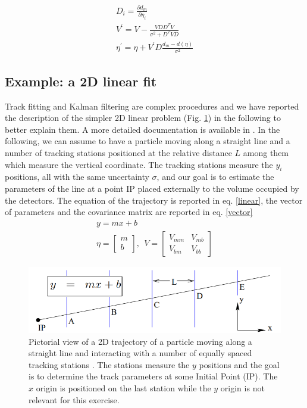 \documentclass[12pt,a4paper,openright, oneside, titlepage]{book} %
\begin{document}
\begin{equation}
\begin{gathered}
D_i = \frac{\partial d_m}{\partial \eta_i} \\
V^\prime = V - \frac{VDD^TV}{\sigma^2+D^TVD}\\
\eta^\prime = \eta + V^\prime D \frac{d_m-d(\eta)}{\sigma^2}
\end{gathered} 
\label{eq_Kalman}
\end{equation}

\subsection{Example: a 2D linear fit}
\label{2Dfit}
Track fitting and Kalman filtering are complex procedures 
and we have reported the description of the simpler 2D linear problem (Fig. \ref{_Kutschke_Kalman})
in the following to better explain them. A more detailed documentation is available in 
 \cite{Kutschke} \cite{KutschkePaper}. 
In the following, we can assume to have a particle moving along a straight line 
and a number of tracking stations positioned at the relative
distance $L$ among them which measure the vertical coordinate.
The tracking stations measure the $y_i$ positions, 
all with the same uncertainty $\sigma$, 
and our goal is to estimate the parameters of the line at a point IP
placed externally to the volume occupied by the detectors.
The equation of the trajectory is reported in eq. \ref{linear}, 
the vector of parameters and the covariance matrix are reported in eq. \ref{vector}
\begin{gather}
y = mx +b \label{linear}\\
\eta = \begin{bmatrix} m \\  b \end{bmatrix},\ \ V=\begin{bmatrix} V_{mm}& V_{mb} \\ V_{bm}& V_{bb} \end{bmatrix} \label{vector}
\end{gather}  

\begin{figure}[h!]
\centering
\includegraphics[scale=0.7]{Kutschke_Kalman}
\caption{Pictorial view of a 2D trajectory of a particle moving along a straight line 
and interacting with a number of equally spaced tracking stations \cite{Kutschke}. 
The stations measure the $y$ positions and the goal is to determine the track parameters 
at some Initial Point (IP). 
The $x$ origin is positioned on the last station while the $y$ origin is not relevant for this exercise.}
\label{_Kutschke_Kalman}
\end{figure}
\end{document}
